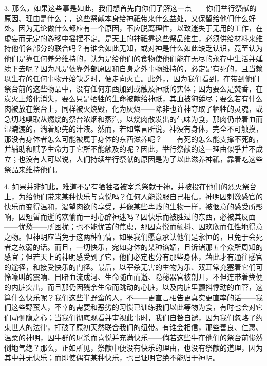 3. 那么，如果这些事是如此，我们想首先向你们了解这一点——你们举行祭献的原因、理由是什么；，这些祭献本身给神祇带来什么益处，又保留给他们什么好处。因为无论做什么都应有一个原因，不应脱离理性，以致迷失于无用的工作，在虚妄而无定的游移中摇摆不定。是天上的神祇靠这些祭品维生，必须供给材料来维持他们各部分的联合吗？有谁会如此无知，或对神是什么如此缺乏认识，竟至认为他们是靠任何养分维持的，认为是给他们的食物使他们能在无尽的永存中生活并延续下去呢？因为凡是依靠外部原因和自身之外事物维持的，必定是有死的，且当赖以生存的任何事物开始缺乏时，便走向灭亡。此外，，因为我们看到，在带到他们祭台前的这些物品中，没有任何东西加到或触及神祇的实体；因为要么是焚香，在炭火上熔化消失，要么只是牺牲的生命被献给神祇，其血被狗舔尽；要么若有什么肉被放在祭台上，同样被火烧毁，化为灰烬——除非也许神夺取了牺牲的灵魂，或急切地嗅取从燃烧的祭台浓烟和蒸汽，以烧肉散发出的气味为食，那肉仍带着血而湿漉漉的，淌着原先的汁液。然而，若如常言所说，神没有身体，完全不可触摸，那没有身体者怎么可能被属于身体的东西滋养呢？——有死的怎么能支撑不死的，并辅助和赋予生命力于它所不能触及的呢？因此，举行祭献的这一理由似乎并不成立；也没有人可以说，人们持续举行祭献的原因是为了以此滋养神祇，靠着吃这些祭品来维持他们。\par

4. 如果并非如此，难道不是有牺牲者被宰杀祭献于神，并被投在他们的烈火祭台上，为给他们带来某种快乐与喜悦吗？任何人能说服自己相信，神明因刺激感官的快乐而变得温和，渴望肉欲的享受，并像某些卑贱的生物一样，被惬意的感受所影响，因短暂而逝的欢愉而一时心醉神迷吗？因快乐而被胜过的东西，必被其反面——忧愁——所困扰；也不能忧苦的焦虑，那因喜悦而颤抖、因欢欣而任性地得意之物。但神明应当免于这两种偏情，如果我们愿意承认他们是永恒的，且免于会死者之软弱的话。而且，一切快乐，宛如身体的某种谄媚，且诉诸那五个众所周知的感官；但若天上的神明感受到了它，他们必定也分有那些身体，藉此才有通往感官的途径，和接受快乐的门径。最后，以宰杀无害的生物为乐、双耳常充塞着它们可怜嚎叫的震响、目睹血流成河、生命随血而逝、隐秘器官被剖开，不但连带着粪便的内脏突出，而且那仍因残余生命而跳动的心脏，以及内脏里颤抖悸动的血管，这算什么快乐呢？我们这些半野蛮的人，不——更直言相告更真实更直率的话——我们这些野蛮人，不幸的需要和恶劣的习惯已训练我们以此等物为食，有时也会对它们动恻隐之心；当我们彻底观看并审视此事时，我们自咎自谴，因为我们忽略了约束世人的法律，打破了原初天然联合我们的纽带。有谁会相信，那些善良、仁惠、温柔的神明，因牛群的屠杀而喜悦并充满快乐——倘若这些牛在他们的祭台前惨然倒地气绝？那么，正如所见，祭献中便没有快乐的理由，也没有祭献的道理，因为其中并无快乐；而即使偶有某种快乐，也已证明它绝不能归于神明。\par

